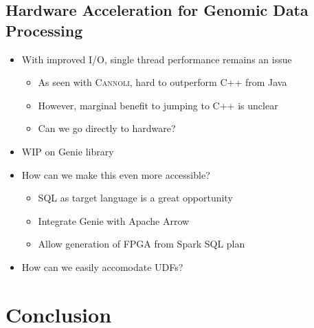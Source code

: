\documentclass[phd]{ucbthesis}
\begin{document}
\section{Hardware Acceleration for Genomic Data Processing}
\label{sec:genomic-hardware}

\begin{itemize}
\item With improved I/O, single thread performance remains an issue
  \begin{itemize}
  \item As seen with \textsc{Cannoli}, hard to outperform C++ from Java
  \item However, marginal benefit to jumping to C++ is unclear
  \item Can we go directly to hardware?
  \end{itemize}
\item WIP on Genie library
\item How can we make this even more accessible?
  \begin{itemize}
  \item SQL as target language is a great opportunity
  \item Integrate Genie with Apache Arrow
  \item Allow generation of FPGA from Spark SQL plan
  \end{itemize}
\item How can we easily accomodate UDFs?
\end{itemize}

\chapter{Conclusion}
\label{chap:conclusion}

\backmatter



\end{document}
